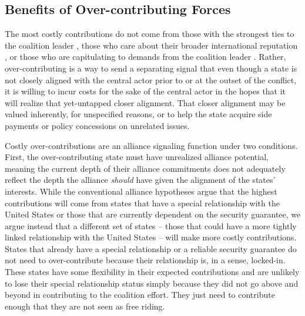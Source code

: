\documentclass[12pt,letterpaper]{article}
\begin{document}
	\subsection{Benefits of Over-contributing Forces}
		The most costly contributions do not come from those with the strongest ties to the coalition leader \citep{ringsmose_natoburdensharingredux_2010, wolford_showingrestraintsignaling_2014}, those who care about their broader international reputation \citep{pedersen_bandwagonstatuschanging_2018}, or those who are capitulating to demands from the coalition leader \citep{schweller_newrealistresearch_1997}. Rather, over-contributing is a way to send a separating signal that even though a state is not closely aligned with the central actor prior to or at the outset of the conflict, it is willing to incur costs for the sake of the central actor in the hopes that it will realize that yet-untapped closer alignment. That closer alignment may be valued inherently, for unspecified reasons, or to help the state acquire side payments or policy concessions on unrelated issues.

		Costly over-contributions are an alliance signaling function under two conditions. First, the over-contributing state must have unrealized alliance potential, meaning the current depth of their alliance commitments does not adequately reflect the depth the alliance \textit{should} have given the alignment of the states' interests. While the conventional alliance hypotheses argue that the highest contributions will come from states that have a special relationship with the United States or those that are currently dependent on the security guarantee, we argue instead that a different set of states -- those that could have a more tightly linked relationship with the United States -- will make more costly contributions. States that already have a special relationship or a reliable security guarantee do not need to over-contribute because their relationship is, in a sense, locked-in. These states have some flexibility in their expected contributions and are unlikely to lose their special relationship status simply because they did not go above and beyond in contributing to the coalition effort. They just need to contribute enough that they are not seen as free riding. 
\end{document}
